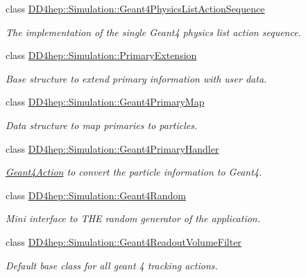 \begin{DoxyCompactItemize}
class \hyperlink{class_d_d4hep_1_1_simulation_1_1_geant4_physics_list_action_sequence}{DD4hep::Simulation::Geant4PhysicsListActionSequence}
\begin{DoxyCompactList}\small\item\em The implementation of the single Geant4 physics list action sequence. \item\end{DoxyCompactList}\item 
class \hyperlink{class_d_d4hep_1_1_simulation_1_1_primary_extension}{DD4hep::Simulation::PrimaryExtension}
\begin{DoxyCompactList}\small\item\em Base structure to extend primary information with user data. \item\end{DoxyCompactList}\item 
class \hyperlink{class_d_d4hep_1_1_simulation_1_1_geant4_primary_map}{DD4hep::Simulation::Geant4PrimaryMap}
\begin{DoxyCompactList}\small\item\em Data structure to map primaries to particles. \item\end{DoxyCompactList}\item 
class \hyperlink{class_d_d4hep_1_1_simulation_1_1_geant4_primary_handler}{DD4hep::Simulation::Geant4PrimaryHandler}
\begin{DoxyCompactList}\small\item\em \hyperlink{class_d_d4hep_1_1_simulation_1_1_geant4_action}{Geant4Action} to convert the particle information to Geant4. \item\end{DoxyCompactList}\item 
class \hyperlink{class_d_d4hep_1_1_simulation_1_1_geant4_random}{DD4hep::Simulation::Geant4Random}
\begin{DoxyCompactList}\small\item\em Mini interface to THE random generator of the application. \item\end{DoxyCompactList}\item 
class \hyperlink{class_d_d4hep_1_1_simulation_1_1_geant4_readout_volume_filter}{DD4hep::Simulation::Geant4ReadoutVolumeFilter}
\begin{DoxyCompactList}\small\item\em Default base class for all geant 4 tracking actions. \item\end{DoxyCompactList}\item 

\end{DoxyCompactItemize}
